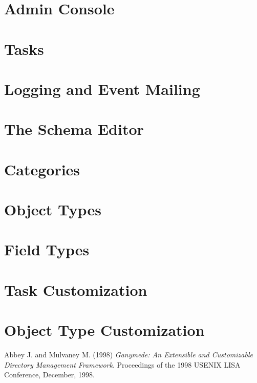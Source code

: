 \documentclass{book}
\begin{document}
\chapter{Admin Console}
\chapter{Tasks}\label{Tasks}
\chapter{Logging and Event Mailing}
\label{Schema}
\chapter{The Schema Editor}
\chapter{Categories}
\chapter{Object Types}
\chapter{Field Types}
\chapter{Task Customization}
\chapter{Object Type Customization}
\begin{thebibliography}{[XXX99]}
	 Abbey J. and Mulvaney M. (1998)
\textsl{Ganymede: An Extensible and Customizable Directory Management
Framework}.  Proceedings of the 1998 USENIX LISA Conference, December,
1998.
\end{thebibliography}
\end{document}

